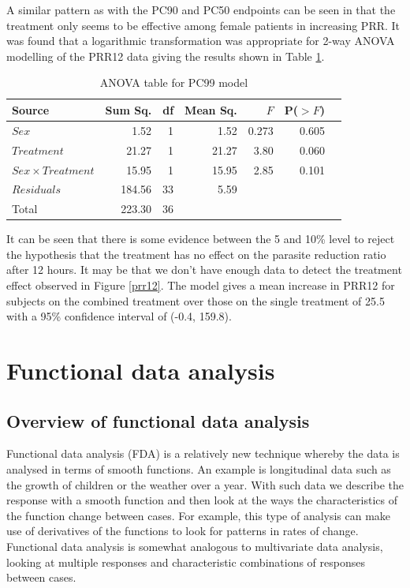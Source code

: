 A similar pattern as with the PC90 and PC50 endpoints can be seen in that the treatment only seems to be effective among female patients in increasing PRR. It was found that a logarithmic transformation was appropriate for 2-way ANOVA modelling of the PRR12 data giving the results shown in Table \ref{aovprr12}.
\begin{table}[h]
\centering
\caption{ANOVA table for PC99 model}\label{aovprr12}
\begin{tabular}{l|rrrrrl}
Source&Sum Sq.&df&Mean Sq.&$F$&P($>F$)\\
\hline
$Sex$				& 1.52 & 1 & 1.52 & 0.273 & 0.605 & \\
$Treatment$			& 21.27   & 1 & 21.27   & 3.80 & 0.060 & \\
$Sex\times Treatment$	& 15.95   & 1 & 15.95   & 2.85   & 0.101 & \\
$Residuals$			& 184.56 & 33 & 5.59 &&&\\
\hline
Total&223.30&36&&&
\end{tabular}
\end{table}

It can be seen that there is some evidence between the 5 and 10\% level to reject the hypothesis that the treatment has no effect on the parasite reduction ratio after 12 hours. It may be that we don't have enough data to detect the treatment effect observed in Figure \ref{prr12}. The model gives a mean increase in PRR12 for subjects on the combined treatment over those on the single treatment of 25.5 with a 95\% confidence interval of (-0.4, 159.8).


\section{Functional data analysis}
\subsection{Overview of functional data analysis}
Functional data analysis (FDA) is a relatively new technique whereby the data is analysed in terms of smooth functions. An example is longitudinal data such as the growth of children or the weather over a year\cite{ramsay}. With such data we describe the response with a smooth function and then look at the ways the characteristics of the function change between cases. For example, this type of analysis can make use of derivatives of the functions to look for patterns in rates of change. Functional data analysis is somewhat analogous to multivariate data analysis, looking at multiple responses and characteristic combinations of responses between cases.

